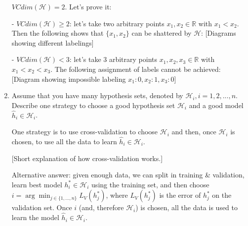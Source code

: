 \documentclass[a4paper,11pt,oneside]{book}
\begin{document}
\begin{enumerate}
        \begin{solution}
            $VCdim(\mathcal{H})=2$. Let's prove it:
            
            - $VCdim(\mathcal{H}) \geq 2$: let's take two arbitrary points $x_1,x_2 \in \mathbb{R}$ with $x_1 < x_2$. Then the following shows that $\{x_1,x_2\}$ can be shattered by $\mathcal{H}$:
            [Diagrams showing different labelings] 
            
            - $VCdim(\mathcal{H}) < 3$: let's take 3 arbitrary points $x_1,x_2,x_3 \in \mathbb{R}$ with $x_1 < x_2 < x_3$. The following assignment of labels cannot be achieved:
            [Diagram showing impossible labeling $x_1:0, x_2:1, x_3:0$]
        \end{solution}
    \item Assume that you have many hypothesis sets, denoted by $\mathcal{H}_i, i = 1,2,...,n$. Describe one strategy to choose a good hypothesis set $\mathcal{H}_i$ and a good model $\hat{h}_i \in \mathcal{H}_i$.
        \begin{solution}
            One strategy is to use cross-validation to choose $\mathcal{H}_i$ and then, once $\mathcal{H}_i$ is chosen, to use all the data to learn $\hat{h}_i \in \mathcal{H}_i$.
            
            [Short explanation of how cross-validation works.]
            
            Alternative answer: given enough data, we can split in training \& validation, learn best model $h_i^* \in \mathcal{H}_i$ using the training set, and then choose $i = \arg\min_{j \in \{1,...,n\}} L_V(h_j^*)$, where $L_V(h_j^*)$ is the error of $h_j^*$ on the validation set. Once $i$ (and, therefore $\mathcal{H}_i$) is chosen, all the data is used to learn the model $\hat{h}_i \in \mathcal{H}_i$.
        \end{solution}
\end{enumerate}

\clearpage
\end{document}
